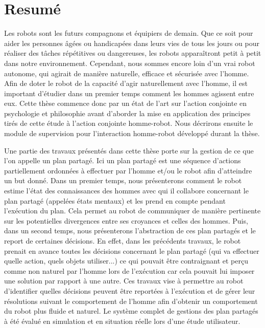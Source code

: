 \documentclass[english,a4paper,11pt,twoside]{StyleThese}
\begin{document}
\chapter*{Resumé}

Les robots sont les futurs compagnons et équipiers de demain. Que ce soit pour aider les personnes âgées ou handicapées dans leurs vies de tous les jours ou pour réaliser des tâches répétitives ou dangereuses, les robots apparaîtront petit à petit dans notre environnement. Cependant, nous sommes encore loin d'un vrai robot autonome, qui agirait de manière naturelle, efficace et sécurisée avec l'homme. 
Afin de doter le robot de la capacité d'agir naturellement avec l'homme, il est important d'étudier dans un premier temps comment les hommes agissent entre eux. Cette thèse commence donc par un état de l'art sur l'action conjointe en psychologie et philosophie avant d'aborder la mise en application des principes tirés de cette étude à l'action conjointe homme-robot.  Nous décrirons ensuite le module de supervision pour l'interaction homme-robot développé durant la thèse.

Une partie des travaux présentés dans cette thèse porte sur la gestion de ce que l'on appelle un plan partagé. Ici un plan partagé est une séquence d'actions partiellement ordonnées à effectuer par l'homme et/ou le robot afin d'atteindre un but donné. Dans un premier temps, nous présenterons comment le robot estime l'état des connaissances des hommes avec qui il collabore concernant le plan partagé (appelées états mentaux) et  les prend en compte pendant l'exécution du plan. Cela permet au robot de communiquer de manière pertinente sur les potentielles divergences entre ses croyances et celles des hommes. Puis, dans un second temps, nous présenterons l'abstraction de ces plan partagés et le report de certaines décisions. En effet, dans les précédents travaux, le robot prenait en avance toutes les décisions concernant le plan partagé (qui va effectuer quelle action, quels objets utiliser...) ce qui pouvait être contraignant et perçu comme non naturel par l'homme lors de l'exécution car cela pouvait lui imposer une solution par rapport à une autre. Ces travaux vise à permettre au robot d'identifier quelles décisions peuvent être reportées à l'exécution et de gérer leur résolutions suivant le comportement de l'homme afin d'obtenir un comportement du robot plus fluide et naturel. Le système complet de gestions des plan partagés à été  évalué en simulation et en situation réelle lors d'une étude utilisateur.
\end{document}
